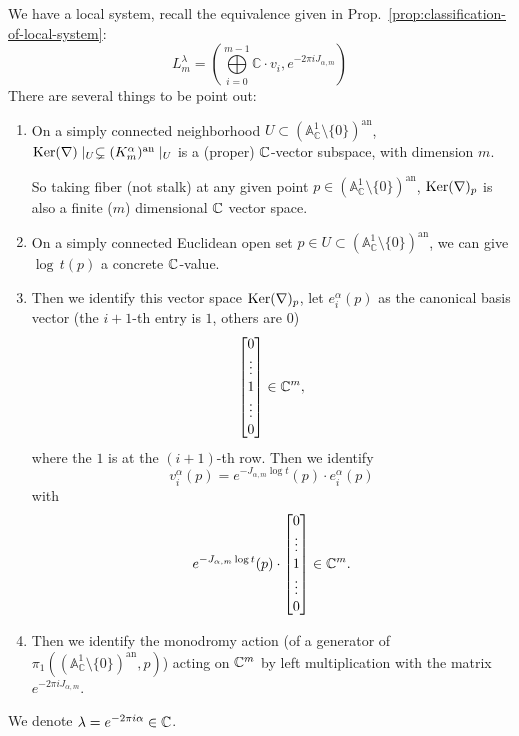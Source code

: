 \bigskip

We have a local system, recall the equivalence given in Prop.~\ref{prop:classification-of-local-system}:
$$
    L_m^{\lambda}=\left(\bigoplus \limits_{i=0}^{m-1}\mathbb{C}\cdot v_{i}, e^{-2\pi iJ_{\alpha,m}}\right)
$$
\label{eq:local_system_L^lambda_m}
There are several things to be point out:
\begin{enumerate}
    \item On a simply connected neighborhood $U\subset (\mathbb{A}_{\mathbb{C}}^1 \setminus \{0\})^{\mathrm{an}}$, $\operatorname{Ker}(\nabla)\mid_U\subsetneq (K^\alpha_m)^{\mathrm{an}}\mid_U$ is a (proper) $\mathbb{C}$-vector subspace, with dimension $m$.

          So taking fiber (not stalk) at any given point $p\in(\mathbb{A}_{\mathbb{C}}^1 \setminus \{0\})^{\mathrm{an}}$, $\operatorname{Ker}(\nabla)_{p}$ is also a finite ($m$) dimensional $\mathbb{C}$ vector space.

    \item On a simply connected Euclidean open set $p \in U \subset (\mathbb{A}_{\mathbb{C}}^1 \setminus \{0\})^{\mathrm{an}}$, we can give $\log\, t(p)$ a concrete $\mathbb{C}$-value.

    \item Then we identify this vector space $\operatorname{Ker}(\nabla)_{p}$, let $e^\alpha_i(p)$ as the canonical basis vector (the $i+1$-th entry is $1$, others are $0$)
          \[
              \begin{bmatrix}
                  0 \\ \vdots \\ 1 \\ \vdots \\ 0
              \end{bmatrix}\in\mathbb{C}^m,
          \]
          where the $1$ is at the $(i+1)$-th row. Then we identify
          \[
              v^\alpha_i(p) = e^{-J_{\alpha,m} \log t}(p) \cdot e^\alpha_i(p)
          \]
          with
          \[
              e^{-J_{\alpha,m} \log t}(p) \cdot \begin{bmatrix}
                  0 \\ \vdots \\ 1 \\ \vdots \\ 0
              \end{bmatrix} \in \mathbb{C}^m.
          \]
    \item Then we identify the monodromy action
          (of a generator of $\pi_1((\mathbb{A}_{\mathbb{C}}^1 \setminus \{0\})^{\mathrm{an}}, p)$)
          acting on $\mathbb{C}^m$ by left multiplication with the matrix $e^{-2\pi i J_{\alpha,m}}$.
\end{enumerate}
We denote $\lambda = e^{-2\pi i \alpha}\in \mathbb{C}$.

